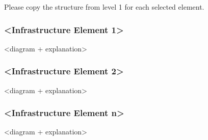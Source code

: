 Please copy the structure from level 1 for each selected element.

\subsubsection{\textless Infrastructure Element 1\textgreater}
\textless diagram + explanation\textgreater

\subsubsection{\textless Infrastructure Element 2\textgreater}
\textless diagram + explanation\textgreater

\subsubsection{\textless Infrastructure Element n\textgreater}
\textless diagram + explanation\textgreater

